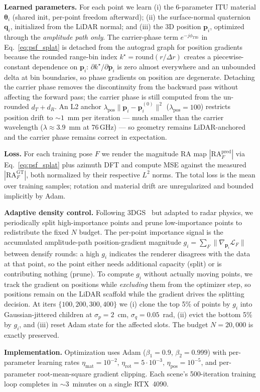 \textbf{Learned parameters.} For each point we learn (i) the 6-parameter ITU material $\boldsymbol{\theta}_i$ (shared init, per-point freedom afterward); (ii) the surface-normal quaternion $\mathbf{q}_i$, initialized from the LiDAR normal; and (iii) the 3D position $\mathbf{p}_i$, optimized through the \emph{amplitude path only}. The carrier-phase term $e^{-j\phi_{T R i}}$ in Eq.~\eqref{eq:psf_splat} is detached from the autograd graph for position gradients because the rounded range-bin index $k^\star = \mathrm{round}(r/\Delta r)$ creates a piecewise-constant dependence on $\mathbf{p}_i$: $\partial k^\star / \partial \mathbf{p}_i$ is zero almost everywhere and an unbounded delta at bin boundaries, so phase gradients on position are degenerate. Detaching the carrier phase removes the discontinuity from the backward pass without affecting the forward pass; the carrier phase is still computed from the un-rounded $d_T + d_R$. An L2 anchor $\lambda_{\text{pos}}\|\mathbf{p}_i - \mathbf{p}_i^{(0)}\|^2$ ($\lambda_{\text{pos}}{=}100$) restricts position drift to ${\sim}1$~mm per iteration --- much smaller than the carrier wavelength ($\lambda \approx 3.9$~mm at 76\,GHz) --- so geometry remains LiDAR-anchored and the carrier phase remains correct in expectation.

\textbf{Loss.} For each training pose $F$ we render the magnitude RA map $|\mathrm{RA}_F^{\text{pred}}|$ via Eq.~\eqref{eq:psf_splat} plus azimuth DFT and compute MSE against the measured $|\mathrm{RA}_F^{\text{GT}}|$, both normalized by their respective $L^2$ norms. The total loss is the mean over training samples; rotation and material drift are unregularized and bounded implicitly by Adam.

\textbf{Adaptive density control.} Following 3DGS~\cite{3dgs} but adapted to radar physics, we periodically split high-importance points and prune low-importance points to redistribute the fixed $N$ budget. The per-point importance signal is the accumulated amplitude-path position-gradient magnitude $g_i = \sum_F \|\nabla_{\mathbf{p}_i} \mathcal{L}_F\|$ between densify rounds: a high $g_i$ indicates the renderer disagrees with the data at that point, so the point either needs additional capacity (split) or is contributing nothing (prune). To compute $g_i$ without actually moving points, we track the gradient on positions while \emph{excluding} them from the optimizer step, so positions remain on the LiDAR scaffold while the gradient drives the splitting decision. At iters $\{100, 200, 300, 400\}$ we (i) clone the top 5\% of points by $g_i$ into Gaussian-jittered children at $\sigma_p = 2$~cm, $\sigma_q = 0.05$~rad, (ii) evict the bottom 5\% by $g_i$, and (iii) reset Adam state for the affected slots. The budget $N{=}20{,}000$ is exactly preserved.

\textbf{Implementation.} Optimization uses Adam ($\beta_1{=}0.9$, $\beta_2{=}0.999$) with per-parameter learning rates $\eta_{\text{mat}}{=}10^{-2}$, $\eta_{\text{rot}}{=}5\!\cdot\!10^{-3}$, $\eta_{\text{pos}}{=}10^{-5}$, and per-parameter root-mean-square gradient clipping. Each scene's 500-iteration training loop completes in ${\sim}3$~minutes on a single RTX~4090.
